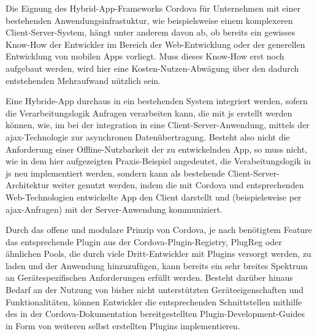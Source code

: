 
Die Eignung des Hybrid-App-Frameworks Cordova für Unternehmen mit einer bestehenden Anwendungsinfrastuktur, wie beispielsweise einem komplexeren Client-Server-System, hängt unter anderem davon ab, ob bereits ein gewisses Know-How der Entwickler im Bereich der Web-Entwicklung oder der generellen Entwicklung von mobilen Apps vorliegt. 
Muss dieses Know-How erst noch aufgebaut werden, wird hier eine Kosten-Nutzen-Abwägung über den dadurch entstehenden Mehraufwand nützlich sein.


Eine Hybride-App durchaus in ein bestehenden System integriert werden, sofern die Verarbeitungslogik Anfragen verarbeiten kann, die mit \gls{js} erstellt werden können, wie, im \zB bei der integration in eine Client-Server-Anwendung, mittels der \gls{ajax}-Technologie zur asynchronen Datenübertragung.
Besteht also nicht die Anforderung einer Offline-Nutzbarkeit der zu entwickelnden App, so muss nicht, wie in dem hier aufgezeigten Praxis-Beispiel angedeutet, die Verabeitungslogik in \gls{js} neu implementiert werden, sondern kann als bestehende Client-Server-Architektur weiter genutzt werden, indem die mit Cordova und entsprechenden Web-Technologien entwickelte App den Client darstellt und (beispielsweise per \gls{ajax}-Anfragen) mit der Server-Anwendung kommuniziert.



Durch das offene und modulare Prinzip von Cordova, je nach benötigtem Feature das entsprechende Plugin aus der Cordova-Plugin-Registry, PlugReg oder ähnlichen Pools, die durch viele Dritt-Entwickler mit Plugins versorgt werden, zu laden und der Anwendung hinzuzufügen, kann bereits ein sehr breites Spektrum an Gerätespezifischen Anforderungen erfüllt werden.
Besteht darüber hinaus Bedarf an der Nutzung von bisher nicht unterstützten Geräteeigenschaften und Funktionalitäten, können Entwickler die entsprechenden Schnittstellen mithilfe des in der Cordova-Dokumentation bereitgestellten Plugin-Development-Guides in Form von weiteren selbst erstellten Plugins implementieren. 



